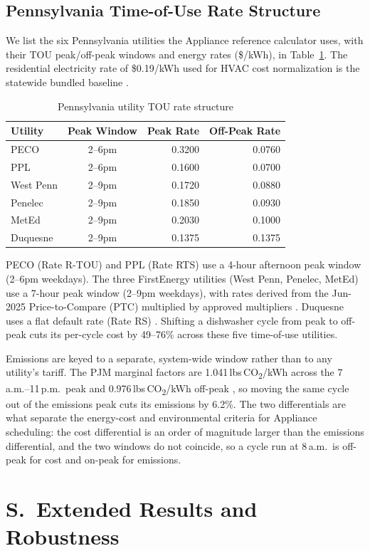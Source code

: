 \documentclass[11pt]{article}
\newcounter{suppsectioncounter}
\newcommand{\suppsection}[1]{%
  \stepcounter{suppsectioncounter}%
  \section*{S\thesuppsectioncounter.\ #1}%
  \setcounter{table}{0}\setcounter{figure}{0}\setcounter{equation}{0}%
  \setcounter{section}{\value{suppsectioncounter}}\setcounter{subsection}{0}%
  \renewcommand{\theHtable}{S\thesuppsectioncounter.\arabic{table}}%
  \renewcommand{\theHfigure}{S\thesuppsectioncounter.\arabic{figure}}%
}
\begin{document}
\subsection{Pennsylvania Time-of-Use Rate Structure}
\label{app:tou_rates}

We list the six Pennsylvania utilities the Appliance reference calculator uses,
with their TOU peak/off-peak windows and energy rates (\$/kWh), in
Table~\ref{tab:tou_rates}. The residential electricity rate of \$0.19/kWh used for HVAC cost normalization is the
statewide bundled baseline \citep{eia_epa_2024,paupc2025}.

\begin{table}[htbp]
\small
\centering
\renewcommand{\arraystretch}{1.15}
\caption{Pennsylvania utility TOU rate structure}
\label{tab:tou_rates}
\begin{tabular}{@{}l c rr@{}}
\toprule
\textbf{Utility} & \textbf{Peak Window} & \textbf{Peak Rate} &
  \textbf{Off-Peak Rate} \\
\midrule
PECO       & 2--6pm  & 0.3200 & 0.0760 \\
PPL        & 2--6pm  & 0.1600 & 0.0700 \\
West Penn  & 2--9pm  & 0.1720 & 0.0880 \\
Penelec    & 2--9pm  & 0.1850 & 0.0930 \\
MetEd      & 2--9pm  & 0.2030 & 0.1000 \\
Duquesne   & 2--9pm  & 0.1375 & 0.1375 \\
\bottomrule
\end{tabular}
\renewcommand{\arraystretch}{1.0}
\end{table}

PECO (Rate R-TOU) \citep{peco2021} and PPL (Rate RTS) \citep{ppl2025} use a 4-hour afternoon peak window (2--6pm weekdays). The three FirstEnergy utilities (West Penn, Penelec, MetEd) use a 7-hour peak window (2--9pm weekdays), with rates derived from the Jun-2025 Price-to-Compare (PTC) multiplied by approved multipliers \citep{firstenergy2025,firstenergy2026}. Duquesne uses a flat default rate (Rate RS) \citep{duquesne2026}. Shifting a dishwasher cycle from peak to off-peak cuts its per-cycle cost by 49--76\% across these five time-of-use utilities.

Emissions are keyed to a separate, system-wide window rather than to any utility's tariff. The PJM marginal factors are 1.041\,lbs\,CO\textsubscript{2}/kWh across the 7\,a.m.--11\,p.m.\ peak and 0.976\,lbs\,CO\textsubscript{2}/kWh off-peak \citep{pjm2022emissions}, so moving the same cycle out of the emissions peak cuts its emissions by 6.2\%. The two differentials are what separate the energy-cost and environmental criteria for Appliance scheduling: the cost differential is an order of magnitude larger than the emissions differential, and the two windows do not coincide, so a cycle run at 8\,a.m.\ is off-peak for cost and on-peak for emissions.
\suppsection{Extended Results and Robustness}
\end{document}

